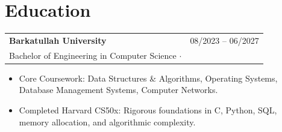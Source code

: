 \documentclass[10pt,letterpaper]{article}
\begin{document}
\section{Education}
\noindent\begin{tabular*}{\textwidth}{@{\extracolsep{\fill}}lr}
  \textbf{Barkatullah University} & {\color{slate600}\small 08/2023 -- 06/2027} \\
  {\color{slate600} Bachelor of Engineering in Computer Science} $\cdot$  & \\
\end{tabular*}\vspace{-2pt}
\begin{itemize}
  \item Core Coursework: Data Structures \& Algorithms, Operating Systems, Database Management Systems, Computer Networks.
  \item Completed Harvard CS50x: Rigorous foundations in C, Python, SQL, memory allocation, and algorithmic complexity.
\end{itemize}\vspace{3pt}
\end{document}
